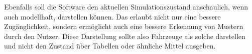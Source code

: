 Ebenfalls soll die Software den aktuellen Simulationszustand anschaulich, wenn auch modellhaft, darstellen können.
Das erlaubt nicht nur eine bessere Zugänglichkeit, sondern ermöglicht auch eine bessere Erkennung von Mustern durch den Nutzer.
Diese Darstellung sollte also Fahrzeuge als solche darstellen und nicht den Zustand über Tabellen oder ähnliche Mittel ausgeben.



\fi
